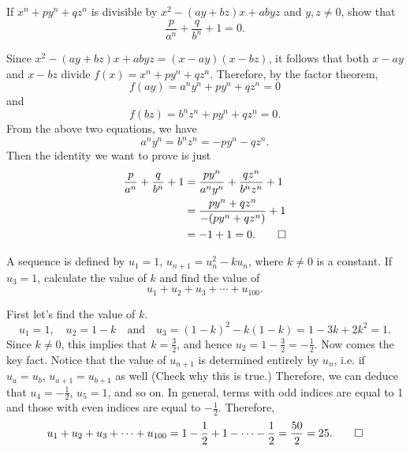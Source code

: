 \begin{question}
    If $x^{n} + py^{n} + qz^{n}$ is divisible by $x^2 - (ay + bz)x + abyz$ and
    $y, z \ne 0$, show that 
    \[\frac{p}{a^n} + \frac{q}{b^n} + 1 = 0.\] 
\end{question}
\begin{solution}
    Since $x^2 - (ay + bz)x + abyz = (x - ay)(x - bz)$, it follows that both $x
    - ay$ and $x - bz$ divide $f(x) = x^n + py^n + qz^n$. Therefore, by the
    factor theorem,
    \[ f(ay) = a^ny^n + py^n + qz^n = 0 \] 
    and 
    \[ f(bz) = b^nz^n + py^n + qz^n = 0.\]
    From the above two equations, we have
    \[ a^ny^n = b^nz^n = -py^n - qz^n.\]
    Then the identity we want to prove is just
    \begin{align*}
        \frac{p}{a^n} + \frac{q}{b^n} + 1 &= \frac{py^n}{a^ny^n} + \frac{qz^n}{b^nz^n} + 1\\
        &= \frac{py^n + qz^n}{-(py^n + qz^n)} + 1\\
        &= -1 + 1 = 0. \qedhere
    \end{align*}
\end{solution}

\begin{question}
    A sequence is defined by $u_{1} = 1$, $u_{n + 1} = u_{n}^2 - ku_{n}$, where
    $k \ne 0$ is a constant. If $u_{3} = 1$, calculate the value of $k$ and
    find the value of
    \[u_{1} + u_{2} + u_{3} + \cdots + u_{100}.\]
\end{question}
\begin{solution}
    First let's find the value of $k$.
    \[ u_1 = 1, \quad u_2 = 1 - k \quad\text{and}\quad u_3 = (1 - k)^2 - k(1 - k) = 1 - 3k + 2k^2 = 1. \]
    Since $k \ne 0$, this implies that $k = \frac{3}{2}$, and hence $u_2 = 1 -
    \frac{3}{2} = -\frac{1}{2}$. Now comes the key fact. Notice that the value
    of $u_{n + 1}$ is determined entirely by $u_n$, i.e. if $u_a = u_b$, $u_{a
    + 1} = u_{b + 1}$ as well (Check why this is true.) Therefore, we can
    deduce that $u_4 = -\frac{1}{2}$, $u_5 = 1$, and so on. In general, terms
    with odd indices are equal to 1 and those with even indices are equal to
    $-\frac{1}{2}$. Therefore,
    \[ u_1 + u_2 + u_3 + \cdots + u_{100} = 1 - \frac{1}{2} + 1 - \cdots -
    \frac{1}{2} = \frac{50}{2} = 25. \qedhere \]
\end{solution}

